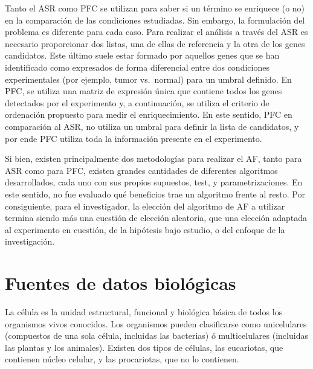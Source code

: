 \documentclass[12pt,twoside]{reedthesis}
\begin{document}
Tanto el ASR como PFC se utilizan para saber si un término se enriquece (o no) en la comparación de las condiciones estudiadas. Sin embargo, la formulación del problema es diferente para cada caso. Para realizar el análisis a través del ASR es necesario proporcionar dos listas, una de ellas de referencia y la otra de los genes candidatos. Este último suele estar formado por aquellos genes que se han identificado como expresados de forma diferencial entre dos condiciones experimentales (por ejemplo, tumor vs.~normal) para un umbral definido. En PFC, se utiliza una matriz de expresión única que contiene todos los genes detectados por el experimento y, a continuación, se utiliza el criterio de ordenación propuesto para medir el enriquecimiento. En este sentido, PFC en comparación al ASR, no utiliza un umbral para definir la lista de candidatos, y por ende PFC utiliza toda la información presente en el experimento.

\par

Si bien, existen principalmente dos metodologías para realizar el AF, tanto para ASR como para PFC, existen grandes cantidades de diferentes algoritmos desarrollados, cada uno con sus propios supuestos, test, y parametrizaciones. En este sentido, no fue evaluado qué beneficios trae un algoritmo frente al resto. Por consiguiente, para el investigador, la elección del algoritmo de AF a utilizar termina siendo más una cuestión de elección aleatoria, que una elección adaptada al experimento en cuestión, de la hipótesis bajo estudio, o del enfoque de la investigación.

\hypertarget{cap:ngs}{%
\chapter{Fuentes de datos biológicas}\label{cap:ngs}}

La célula es la unidad estructural, funcional y biológica básica de todos los organismos vivos conocidos. Los organismos pueden clasificarse como unicelulares (compuestos de una sola célula, incluidas las bacterias) ó multicelulares (incluidas las plantas y los animales). Existen dos tipos de células, las eucariotas, que contienen núcleo celular, y las procariotas, que no lo contienen.
\end{document}
